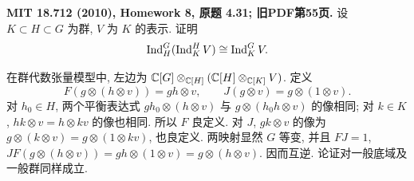 \begin{exercise}\label{hw:4.31}
\textbf{MIT 18.712 (2010), Homework 8, 原题 4.31; 旧PDF第55页.}
设 $K\subset H\subset G$ 为群, $V$ 为 $K$ 的表示. 证明
\[
 \operatorname{Ind}_H^G(\operatorname{Ind}_K^HV)\cong\operatorname{Ind}_K^GV.
\]
\end{exercise}
\begin{solution}
在群代数张量模型中, 左边为 $\mathbb C[G]\otimes_{\mathbb C[H]}(\mathbb C[H]\otimes_{\mathbb C[K]}V)$. 定义
\[
 F(g\otimes(h\otimes v))=gh\otimes v,\qquad
 J(g\otimes v)=g\otimes(1\otimes v).
\]
对 $h_0\in H$, 两个平衡表达式 $gh_0\otimes(h\otimes v)$ 与 $g\otimes(h_0h\otimes v)$ 的像相同; 对 $k\in K$, $h k\otimes v=h\otimes kv$ 的像也相同. 所以 $F$ 良定义. 对 $J$, $gk\otimes v$ 的像为 $g\otimes(k\otimes v)=g\otimes(1\otimes kv)$, 也良定义. 两映射显然 $G$ 等变, 并且 $FJ=1$, $JF(g\otimes(h\otimes v))=gh\otimes(1\otimes v)=g\otimes(h\otimes v)$. 因而互逆. 论证对一般底域及一般群同样成立.
\end{solution}

